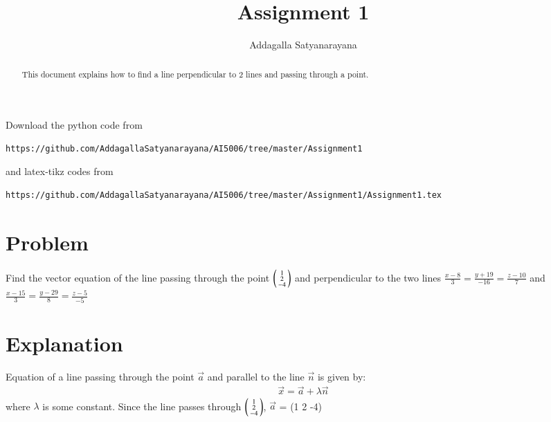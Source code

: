 \documentclass[journal,12pt,twocolumn]{IEEEtran}
\begin{document}
\renewcommand{\thefigure}{\theproblem}
\def\putbox#1#2#3{\makebox[0in][l]{\makebox[#1][l]{}\raisebox{\baselineskip}[0in][0in]{\raisebox{#2}[0in][0in]{#3}}}}
     \def\rightbox#1{\makebox[0in][r]{#1}}
     \def\centbox#1{\makebox[0in]{#1}}
     \def\topbox#1{\raisebox{-\baselineskip}[0in][0in]{#1}}
     \def\midbox#1{\raisebox{-0.5\baselineskip}[0in][0in]{#1}}
\vspace{3cm}
\title{Assignment 1}
\author{Addagalla Satyanarayana}
\maketitle
\newpage
\bigskip
\renewcommand{\thefigure}{\theenumi}
\renewcommand{\thetable}{\theenumi}
\begin{abstract}
This document explains how to find a line perpendicular to 2 lines and passing through a point.
\end{abstract}
Download the python code from 
%
\begin{lstlisting}
https://github.com/AddagallaSatyanarayana/AI5006/tree/master/Assignment1
\end{lstlisting}
%
and latex-tikz codes from 
%
\begin{lstlisting}
https://github.com/AddagallaSatyanarayana/AI5006/tree/master/Assignment1/Assignment1.tex
\end{lstlisting}
%
\section{Problem}
Find the vector equation of the line passing through the point
$\begin{psmallmatrix}1 \\2 \\-4	\end{psmallmatrix}$
and perpendicular to the two lines
   	$\frac{x-8}{3} = \frac{y+19}{-16}= \frac{z-10}{7}$  and
	$\frac{x-15}{3} = \frac{y-29}{8}= \frac{z-5}{-5}$
	
	
\section{Explanation}
Equation of a line passing through the point $\vec{a}$ and parallel to the line $\vec{n}$ is given by:
\begin{align}
 \vec{x} =\vec{a} + \lambda\vec{n} 
\end{align}
where $\lambda$ is some constant.
Since the line passes through 
	$\begin{psmallmatrix}1 \\2\\-4\end{psmallmatrix} $,
$\vec{a}$ = (1  2 -4)
\end{document}
